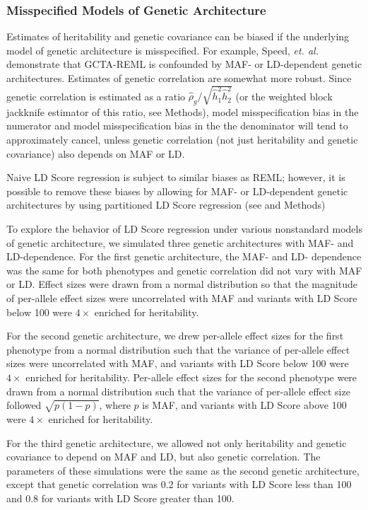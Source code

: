 \documentclass[11pt]{article}
\numberwithin{equation}{section}
\begin{document}
\subsubsection{Misspecified Models of Genetic Architecture}


Estimates of heritability and genetic covariance can be biased if the underlying model of genetic architecture is misspecified.
For example, Speed, \emph{et. al.} \cite{speed2012improved} 
demonstrate that GCTA-REML is confounded by MAF- or LD-dependent genetic architectures.
Estimates of genetic correlation are somewhat more robust.
Since genetic correlation is estimated as a ratio $\hat{\rho}_g / \sqrt{\hat{h}^2_1\hat{h}^2_2}$
(or the weighted block jackknife estimator of this ratio, see Methods),
model misspecification bias in the numerator and model misspecification bias in the the denominator 
will tend to approximately cancel, unless genetic correlation 
(not just heritability and genetic covariance) also depends on MAF or LD.

Naive LD Score regression is subject to similar biases as REML; however,
it is possible to remove these biases by allowing for MAF- or LD-dependent genetic architectures by using partitioned LD 
Score regression (see \cite{finucane2014partitioning} and Methods)

To explore the behavior of LD Score regression under various nonstandard models of genetic architecture, 
we simulated three genetic architectures with MAF- and LD-dependence.
For the first genetic architecture,
the MAF- and LD- dependence was the same for both phenotypes and genetic correlation did not vary with MAF or LD. 
Effect sizes were drawn from a normal distribution so that the magnitude of per-allele effect sizes were uncorrelated with MAF and variants with LD Score below 100 were $4\times$ enriched for heritability.

For the second genetic architecture, 
we drew per-allele effect sizes for the first phenotype from a normal distribution 
such that the variance of per-allele effect sizes were uncorrelated with MAF, 
and variants with LD Score below 100 were $4\times$ enriched for heritability.
Per-allele effect sizes for the second phenotype were drawn from a normal distribution 
such that the variance of per-allele effect size followed $\sqrt{p(1-p)}$, 
where $p$ is MAF, and variants with LD Score above 100 were $4\times$ enriched for heritability. 

For the third genetic architecture, we allowed not only heritability and genetic covariance to depend on MAF and LD,
but also genetic correlation. 
The parameters of these simulations were the same as the second genetic architecture, 
except that genetic correlation was 0.2 for variants with LD Score less than 100 and 0.8 for variants with LD Score greater than 100. 
\end{document}
